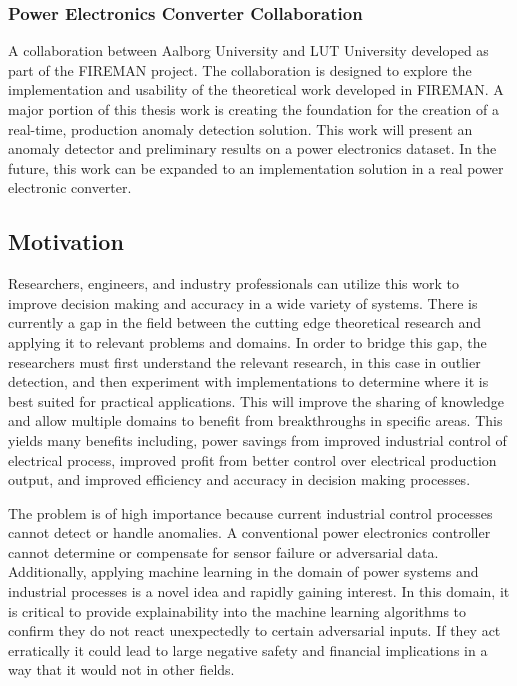 \subsubsection{Power Electronics Converter Collaboration}

A collaboration between Aalborg University and LUT University developed as part of the FIREMAN project. The collaboration is designed to explore the implementation and usability of the theoretical work developed in FIREMAN. A major portion of this thesis work is creating the foundation for the creation of a real-time, production anomaly detection solution. This work will present an anomaly detector and preliminary results on a power electronics dataset. In the future, this work can be expanded to an implementation solution in a real power electronic converter.

\subsection{Motivation}

Researchers, engineers, and industry professionals can utilize this work to improve decision making and accuracy in a wide variety of systems. There is currently a gap in the field between the cutting edge theoretical research and applying it to relevant problems and domains. In order to bridge this gap, the researchers must first understand the relevant research, in this case in outlier detection, and then experiment with implementations to determine where it is best suited for practical applications. This will improve the sharing of knowledge and allow multiple domains to benefit from breakthroughs in specific areas. This yields many benefits including, power savings from improved industrial control of electrical process, improved profit from better control over electrical production output, and improved efficiency and accuracy in decision making processes.

The problem is of high importance because current industrial control processes cannot detect or handle anomalies. A conventional power electronics controller cannot determine or compensate for sensor failure or adversarial data. Additionally, applying machine learning in the domain of power systems and industrial processes is a novel idea and rapidly gaining interest. In this domain, it is critical to provide explainability into the machine learning algorithms to confirm they do not react unexpectedly to certain adversarial inputs. If they act erratically it could lead to large negative safety and financial implications in a way that it would not in other fields.


